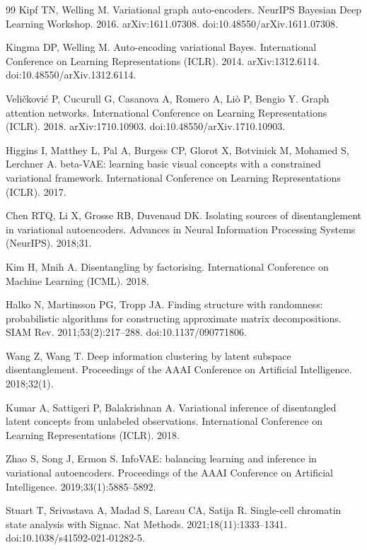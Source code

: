 \documentclass[referee, pdflatex, sn-vancouver-num]{sn-jnl}
\begin{document}
\begin{thebibliography}{99}
Kipf TN, Welling M. Variational graph auto-encoders. NeurIPS Bayesian Deep Learning Workshop. 2016. arXiv:1611.07308. doi:10.48550/arXiv.1611.07308.

Kingma DP, Welling M. Auto-encoding variational Bayes. International Conference on Learning Representations (ICLR). 2014. arXiv:1312.6114. doi:10.48550/arXiv.1312.6114.

Veli\v{c}kovi\'c P, Cucurull G, Casanova A, Romero A, Li\`o P, Bengio Y. Graph attention networks. International Conference on Learning Representations (ICLR). 2018. arXiv:1710.10903. doi:10.48550/arXiv.1710.10903.

Higgins I, Matthey L, Pal A, Burgess CP, Glorot X, Botvinick M, Mohamed S, Lerchner A. beta-VAE: learning basic visual concepts with a constrained variational framework. International Conference on Learning Representations (ICLR). 2017.

Chen RTQ, Li X, Grosse RB, Duvenaud DK. Isolating sources of disentanglement in variational autoencoders. Advances in Neural Information Processing Systems (NeurIPS). 2018;31.

Kim H, Mnih A. Disentangling by factorising. International Conference on Machine Learning (ICML). 2018.

Halko N, Martinsson PG, Tropp JA. Finding structure with randomness: probabilistic algorithms for constructing approximate matrix decompositions. SIAM Rev. 2011;53(2):217--288. doi:10.1137/090771806.

Wang Z, Wang T. Deep information clustering by latent subspace disentanglement. Proceedings of the AAAI Conference on Artificial Intelligence. 2018;32(1).

Kumar A, Sattigeri P, Balakrishnan A. Variational inference of disentangled latent concepts from unlabeled observations. International Conference on Learning Representations (ICLR). 2018.

Zhao S, Song J, Ermon S. InfoVAE: balancing learning and inference in variational autoencoders. Proceedings of the AAAI Conference on Artificial Intelligence. 2019;33(1):5885--5892.

Stuart T, Srivastava A, Madad S, Lareau CA, Satija R. Single-cell chromatin state analysis with Signac. Nat Methods. 2021;18(11):1333--1341. doi:10.1038/s41592-021-01282-5.


\end{thebibliography}
\end{document}
